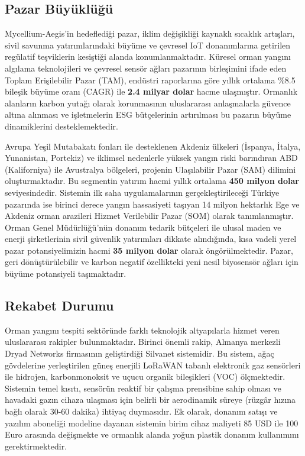 \documentclass[11pt,a4paper]{article}
\begin{document}
\subsection{Pazar Büyüklüğü}

Mycellium-Aegis'in hedeflediği pazar, iklim değişikliği kaynaklı sıcaklık artışları, sivil savunma yatırımlarındaki büyüme ve çevresel IoT donanımlarına getirilen regülatif teşviklerin kesiştiği alanda konumlanmaktadır. Küresel orman yangını algılama teknolojileri ve çevresel sensör ağları pazarının birleşimini ifade eden Toplam Erişilebilir Pazar (TAM), endüstri raporlarına göre yıllık ortalama \%8.5 bileşik büyüme oranı (CAGR) ile \textbf{2.4 milyar dolar} hacme ulaşmıştır. Ormanlık alanların karbon yutağı olarak korunmasının uluslararası anlaşmalarla güvence altına alınması ve işletmelerin ESG bütçelerinin artırılması bu pazarın büyüme dinamiklerini desteklemektedir.

Avrupa Yeşil Mutabakatı fonları ile desteklenen Akdeniz ülkeleri (İspanya, İtalya, Yunanistan, Portekiz) ve iklimsel nedenlerle yüksek yangın riski barındıran ABD (Kaliforniya) ile Avustralya bölgeleri, projenin Ulaşılabilir Pazar (SAM) dilimini oluşturmaktadır. Bu segmentin yatırım hacmi yıllık ortalama \textbf{450 milyon dolar} seviyesindedir. Sistemin ilk saha uygulamalarının gerçekleştirileceği Türkiye pazarında ise birinci derece yangın hassasiyeti taşıyan 14 milyon hektarlık Ege ve Akdeniz orman arazileri Hizmet Verilebilir Pazar (SOM) olarak tanımlanmıştır. Orman Genel Müdürlüğü'nün donanım tedarik bütçeleri ile ulusal maden ve enerji şirketlerinin sivil güvenlik yatırımları dikkate alındığında, kısa vadeli yerel pazar potansiyelimizin hacmi \textbf{35 milyon dolar} olarak öngörülmektedir. Pazar, geri dönüştürülebilir ve karbon negatif özellikteki yeni nesil biyosensör ağları için büyüme potansiyeli taşımaktadır.

\subsection{Rekabet Durumu}

Orman yangını tespiti sektöründe farklı teknolojik altyapılarla hizmet veren uluslararası rakipler bulunmaktadır. Birinci önemli rakip, Almanya merkezli Dryad Networks firmasının geliştirdiği Silvanet sistemidir. Bu sistem, ağaç gövdelerine yerleştirilen güneş enerjili LoRaWAN tabanlı elektronik gaz sensörleri ile hidrojen, karbonmonoksit ve uçucu organik bileşikleri (VOC) ölçmektedir. Sistemin temel kısıtı, sensörün reaktif bir çalışma prensibine sahip olması ve havadaki gazın cihaza ulaşması için belirli bir aerodinamik süreye (rüzgâr hızına bağlı olarak 30-60 dakika) ihtiyaç duymasıdır. Ek olarak, donanım satışı ve yazılım aboneliği modeline dayanan sistemin birim cihaz maliyeti 85 USD ile 100 Euro arasında değişmekte ve ormanlık alanda yoğun plastik donanım kullanımını gerektirmektedir.
\end{document}
